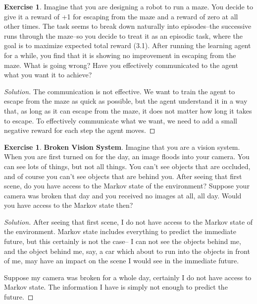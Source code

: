 \documentclass[oneside,11pt]{article}
\theoremstyle{definition}
\newtheorem{exer}[thm]{Exercise}
\newenvironment{solution}
{\renewcommand\qedsymbol{$\blacksquare$}\begin{proof}[Solution]} {\end{proof}}
\begin{document}
\begin{exer}
Imagine that you are designing a robot to run a maze. You decide to give it a reward of +1 for escaping from the maze and a reward of zero at all other times. The task seems to break down naturally into episodes--the successive runs through the maze--so you decide to treat it as an episodic task, where the goal is to maximize expected total reward (3.1). After running the learning agent for a while, you find that it is showing no improvement in escaping from the maze. What is going wrong? Have you effectively communicated to the agent what you want it to achieve?
\end{exer}

\begin{shaded}
\begin{solution} 

The communication is not effective. We want to train the agent to escape from the maze as quick as possible, but the agent understand it in a way that, as long as it can escape from the maze, it does not matter how long it takes to escape. To effectively communicate what we want, we need to add a small negative reward for each step the agent moves. 
\end{solution}
\end{shaded}

\begin{exer}
\textbf{Broken Vision System}. Imagine that you are a vision system. When you are first turned on for the day, an image floods into your camera. You can see lots of things, but not all things. You can't see objects that are occluded, and of course you can't see objects that are behind you. After seeing that first scene, do you have access to the Markov state of the environment? Suppose your camera was broken that day and you received no images at all, all day. Would you have access to the Markov state then?
\end{exer}

\begin{shaded}
\begin{solution} 
After seeing that first scene, I do not have access to the Markov state of the environment. Markov state includes everything to predict the immediate future, but this certainly is not the case-- I can not see the objects behind me, and the object behind me, say, a car which about to run into the objects in front of me, may have an impact on the scene I would see in the immediate future.

Suppose my camera was broken for a whole day, certainly I do not have access to Markov state. The information I have is simply not enough to predict the future.
\end{solution}
\end{shaded}
\end{document}
